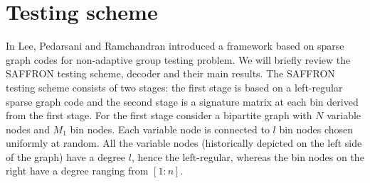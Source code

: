 \documentclass[conference,twocolumn]{IEEEtran}
\DeclareMathOperator*{\bigORtxt}{\scalerel*{\text{$\vee$}}{\textstyle\sum}}
\begin{document}
%

\section{Testing scheme}
In \cite{lee2015saffron} Lee, Pedarsani and Ramchandran introduced a framework based on sparse graph codes for non-adaptive group testing problem. We will briefly review the SAFFRON testing scheme, decoder and their main results. The SAFFRON testing scheme consists of two stages: the first stage is based on a left-regular sparse graph code and the second stage is a signature matrix at each bin derived from the first stage. For the first stage consider a bipartite graph with $N$ variable nodes and $M_1$ bin nodes. Each variable node is connected to $l$ bin nodes chosen uniformly at random. All the variable nodes (historically depicted on the left side of the graph) have a degree $l$, hence the left-regular, whereas the bin nodes on the right have a degree ranging from $[1:n]$.\\
\end{document}
